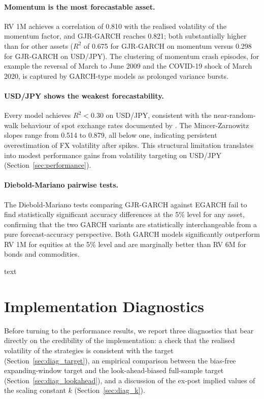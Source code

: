 \documentclass[12pt, a4paper]{article}
\begin{document}
\paragraph{Momentum is the most forecastable asset.}
RV 1M achieves a correlation of 0.810 with the realised volatility of the momentum factor,
and GJR-GARCH reaches 0.821; both substantially higher than for other assets ($R^2$ of
0.675 for GJR-GARCH on momentum versus 0.298 for GJR-GARCH on USD/JPY). The clustering
of momentum crash episodes, for example the reversal of March to June 2009 and the
COVID-19 shock of March 2020, is captured by GARCH-type models as prolonged variance
bursts.

\paragraph{USD/JPY shows the weakest forecastability.}
Every model achieves $R^2 < 0.30$ on USD/JPY, consistent with the near-random-walk
behaviour of spot exchange rates documented by \citet{Meese1983}. The Mincer-Zarnowitz
slopes range from 0.514 to 0.879, all below one, indicating persistent overestimation of
FX volatility after spikes. This structural limitation translates into modest performance
gains from volatility targeting on USD/JPY (Section~\ref{sec:performance}).

\paragraph{Diebold-Mariano pairwise tests.}
The Diebold-Mariano tests comparing GJR-GARCH against EGARCH fail to find statistically
significant accuracy differences at the 5\% level for any asset, confirming that the two
GARCH variants are statistically interchangeable from a pure forecast-accuracy
perspective. Both GARCH models significantly outperform RV 1M for equities at the 5\%
level and are marginally better than RV 6M for bonds and commodities.

text

\section{Implementation Diagnostics}
\label{sec:diagnostics}

Before turning to the performance results, we report three diagnostics that bear directly
on the credibility of the implementation: a check that the realised volatility of the
strategies is consistent with the target (Section~\ref{sec:diag_target}), an empirical
comparison between the bias-free expanding-window target and the look-ahead-biased
full-sample target (Section~\ref{sec:diag_lookahead}), and a discussion of the
ex-post implied values of the scaling constant $k$ (Section~\ref{sec:diag_k}).
\end{document}
